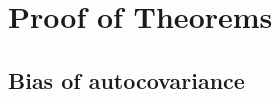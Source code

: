 \documentclass[11pt]{article}
\newtheorem{lemma}{Lemma}
\theoremstyle{remark}
\begin{document}



\section{Proof of Theorems} \label{appendix:A}

\subsection{Bias of autocovariance} \label{appendix:bias}
\end{document}
